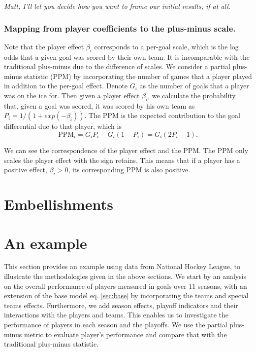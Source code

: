 {\em Matt, I'll let you decide how you want to frame our initial results, if at all.}

\subsubsection{Mapping from player coefficients to the plus-minus scale.}
\label{sec:ppm.mapping}
Note that the player effect $\beta_i$ corresponds to a per-goal scale, which is the log odds that a given goal was scored by their own team. It is incomparable with the traditional plus-minus due to the difference of scales. We consider a partial plus-minus statistic (PPM) by incorporating the number of games that a player played in addition to the per-goal effect. Denote $G_i$ as the number of goals that a player was on the ice for. Then given a player effect $\beta_i$, we calculate the probability that, given a goal was scored, it was scored by his own team as $P_i=1/(1+exp(-\beta_i))$. The PPM is the expected contribution to the goal differential due to that player, which is 
\begin{equation}
\text{PPM}_i = G_iP_i-G_i(1-P_i)=G_i(2P_i-1).
\label{eq:ppm}
\end{equation}

We can see the correspondence of the player effect and the PPM. The PPM only scales the player effect with the sign retains. This means that if a player has a positive effect, $\beta_i>0$, its corresponding PPM is also positive. 


\section{Embellishments}
\label{sec:embell}

\section{An example}
\label{sec:example}
This section provides an example using data from National Hockey League, to illustrate the methodologies given in the above sections. We start by an analysis on the overall performance of players measured in goals over $11$ seasons, with an extension of the base model eq. \eqref{sec:base} by incorporating the teams and special teams effects. Furthermore, we add season effects, playoff indicators and their interactions with the players and teams. This enables us to investigate the performance of players in each season and the playoffs. We use the partial plus-minus metric to evaluate player's performance and compare that with the traditional plus-minus statistic.

